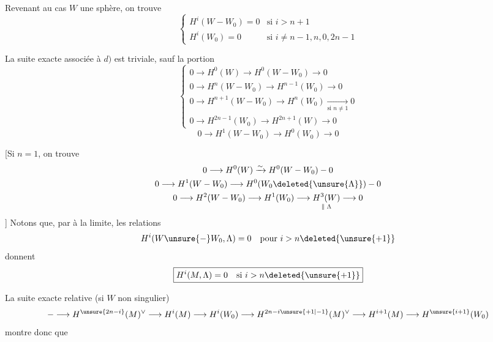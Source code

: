 Revenant au cas $W$ une sphère, on trouve
\[\left\{\begin{array}{ll}H^i(W-W_0)=0&\text{si }i>n+1\\H^i(W_0)=0&\text{si }i\ne n-1,n,0,2n-1\end{array}\right.\]
\margin{[en fait, si $i\ne\deleted{\unsure{n,n+1}}\deleted{\unsure{]}}0,1,n,n+1$]}
\margin{(d'abord si $i\ge n+1$ et $i\ne2n-1$, puis le reste par dualité]}

La suite exacte associée à $d)$ est triviale, sauf la portion
\[\left\{\begin{gathered}
0\longrightarrow H^0(W)\longrightarrow H^0(W-W_0)\longrightarrow0\\
0\longrightarrow H^n(W-W_0)\longrightarrow H^{n-1}(W_0)\longrightarrow0\\
0\longrightarrow H^{n+1}(W-W_0)\longrightarrow H^n(W_0)\xrightarrow[\text{si }n\ne1]{}0\\
0\longrightarrow H^{2n-1}(W_0)\longrightarrow H^{2n+1}(W)\longrightarrow0
\end{gathered}\right.\]
\[0\longrightarrow H^1(W-W_0)\longrightarrow H^0(W_0)\longrightarrow0\]
\deleted{\[\unsure{n+1\ne2n+1}\]}
\deleted{\[n+2\ne2n+1\]}

[Si $n=1$, on trouve
\[\begin{gathered}
0\longrightarrow H^0(W)\xrightarrow{\sim}H^0(W-W_0)\mathbin{-}0\\
0\longrightarrow H^1(W-W_0)\longrightarrow H^0(W_0\deleted{\unsure{\Lambda}})\mathbin{-}0\\
0\longrightarrow H^2(W-W_0)\longrightarrow H^1(W_0)\longrightarrow\underset{\Vert\;\Lambda}{H^3(W)}\longrightarrow0
\end{gathered}\]
]
Notons que, par  à la limite,  les relations
\[H^i(W\unsure{-}W_0,\Lambda)=0\quad\text{pour }i>n\deleted{\unsure{+1}}\]
donnent
\[\boxed{H^i(M,\Lambda)=0\quad\text{si }i>n\deleted{\unsure{+1}}}\]

La suite exacte relative (si $W$ non singulier)
\[\mathbin{-}\longrightarrow H^{\unsure{2n-i}}(M)^\vee\longrightarrow H^i(M)\longrightarrow H^i(W_0)\longrightarrow H^{2n-i\unsure{+1|-1}}(M)^\vee\longrightarrow H^{i+1}(M)\longrightarrow H^{\unsure{i+1}}(W_0)\]
montre donc que

